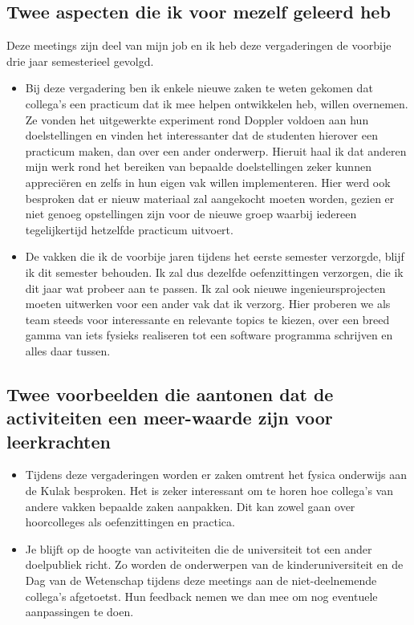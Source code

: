 \documentclass[a4paper,12pt,twoside]{article}%
\begin{document}
	\subsection{Twee aspecten die ik voor mezelf geleerd heb}
		Deze meetings zijn deel van mijn job en ik heb deze vergaderingen de voorbije drie jaar semesterieel gevolgd. 
	\begin{itemize}
		\item Bij deze vergadering ben ik enkele nieuwe zaken te weten gekomen dat collega's een practicum dat ik mee helpen ontwikkelen heb, willen overnemen. Ze vonden het uitgewerkte experiment rond Doppler voldoen aan hun doelstellingen en vinden het interessanter dat de studenten hierover een practicum maken, dan over een ander onderwerp. Hieruit haal ik dat anderen mijn werk rond het bereiken van bepaalde doelstellingen zeker kunnen appreciëren en zelfs in hun eigen vak willen implementeren. Hier werd ook besproken dat er nieuw materiaal zal aangekocht moeten worden, gezien er niet genoeg opstellingen zijn voor de nieuwe groep waarbij iedereen tegelijkertijd hetzelfde practicum uitvoert.
		\item De vakken die ik de voorbije jaren tijdens het eerste semester verzorgde, blijf ik dit semester behouden. Ik zal dus dezelfde oefenzittingen verzorgen, die ik dit jaar wat probeer aan te passen. Ik zal ook nieuwe ingenieursprojecten moeten uitwerken voor een ander vak dat ik verzorg. Hier proberen we als team steeds voor interessante en relevante topics te kiezen, over een breed gamma van iets fysieks realiseren tot een software programma schrijven en alles daar tussen.
	\end{itemize}


	\subsection{Twee voorbeelden die aantonen dat de activiteiten een meer-waarde zijn voor leerkrachten}
	\begin{itemize}
		\item Tijdens deze vergaderingen worden er zaken omtrent het fysica onderwijs aan de Kulak besproken. Het is zeker interessant om te horen hoe collega's van andere vakken bepaalde zaken aanpakken. Dit kan zowel gaan over hoorcolleges als oefenzittingen en practica. 
		\item Je blijft op de hoogte van activiteiten die de universiteit tot een ander doelpubliek richt. Zo worden de onderwerpen van de kinderuniversiteit en de Dag van de Wetenschap tijdens deze meetings aan de niet-deelnemende collega's afgetoetst. Hun feedback nemen we dan mee om nog eventuele aanpassingen te doen.
	\end{itemize}
\end{document}
